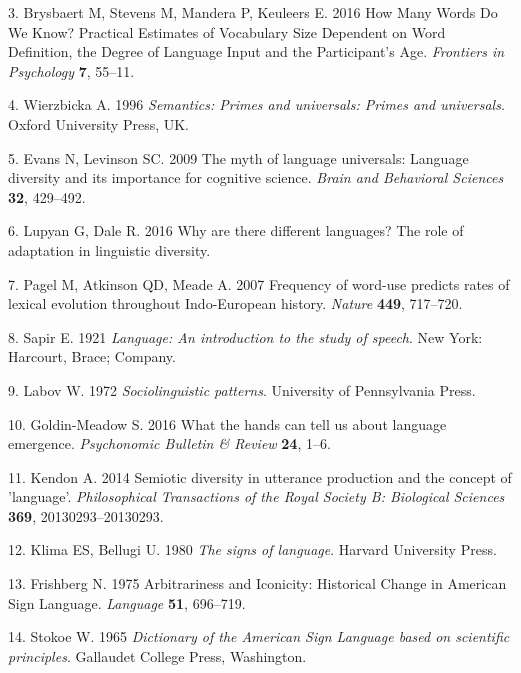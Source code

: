 \documentclass[english,floatsintext,man]{apa6}
\theoremstyle{definition}
\theoremstyle{definition}
\theoremstyle{definition}
\theoremstyle{remark}
\begin{document}
\leavevmode\hypertarget{ref-Brysbaert:2016fg}{}%
3. Brysbaert M, Stevens M, Mandera P, Keuleers E. 2016 How Many Words Do
We Know? Practical Estimates of Vocabulary Size Dependent on Word
Definition, the Degree of Language Input and the Participant's Age.
\emph{Frontiers in Psychology} \textbf{7}, 55--11.

\leavevmode\hypertarget{ref-Wierzbicka:1996sm}{}%
4. Wierzbicka A. 1996 \emph{Semantics: Primes and universals: Primes and
universals}. Oxford University Press, UK.

\leavevmode\hypertarget{ref-Evans:2009dk}{}%
5. Evans N, Levinson SC. 2009 The myth of language universals: Language
diversity and its importance for cognitive science. \emph{Brain and
Behavioral Sciences} \textbf{32}, 429--492.

\leavevmode\hypertarget{ref-Lupyan:2016uw}{}%
6. Lupyan G, Dale R. 2016 Why are there different languages? The role of
adaptation in linguistic diversity.

\leavevmode\hypertarget{ref-Pagel:2007br}{}%
7. Pagel M, Atkinson QD, Meade A. 2007 Frequency of word-use predicts
rates of lexical evolution throughout Indo-European history.
\emph{Nature} \textbf{449}, 717--720.

\leavevmode\hypertarget{ref-Sapir:1921}{}%
8. Sapir E. 1921 \emph{Language: An introduction to the study of
speech}. New York: Harcourt, Brace; Company.

\leavevmode\hypertarget{ref-Labov:1972}{}%
9. Labov W. 1972 \emph{Sociolinguistic patterns}. University of
Pennsylvania Press.

\leavevmode\hypertarget{ref-GoldinMeadow:2016bw}{}%
10. Goldin-Meadow S. 2016 What the hands can tell us about language
emergence. \emph{Psychonomic Bulletin \& Review} \textbf{24}, 1--6.

\leavevmode\hypertarget{ref-Kendon:2014eg}{}%
11. Kendon A. 2014 Semiotic diversity in utterance production and the
concept of 'language'. \emph{Philosophical Transactions of the Royal
Society B: Biological Sciences} \textbf{369}, 20130293--20130293.

\leavevmode\hypertarget{ref-Klima:1980si}{}%
12. Klima ES, Bellugi U. 1980 \emph{The signs of language}. Harvard
University Press.

\leavevmode\hypertarget{ref-Frishberg:1975dh}{}%
13. Frishberg N. 1975 Arbitrariness and Iconicity: Historical Change in
American Sign Language. \emph{Language} \textbf{51}, 696--719.

\leavevmode\hypertarget{ref-Stokoe:1965}{}%
14. Stokoe W. 1965 \emph{Dictionary of the American Sign Language based
on scientific principles}. Gallaudet College Press, Washington.
\end{document}
